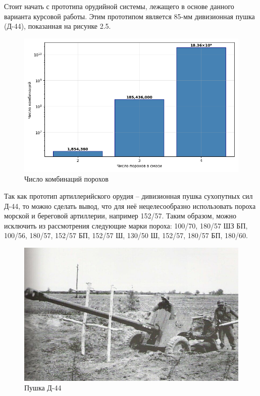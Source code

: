 \documentclass[14pt, a4paper]{extreport} %
\begin{document}
Стоит начать с прототипа орудийной системы, лежащего в основе данного варианта курсовой работы. Этим прототипом является 85-мм дивизионная пушка (Д-44), показанная на рисунке 2.5.

\begin{figure}[H]
\centering
\includegraphics[width=0.5\textheight]{imgs/GISTO.png}
\caption{Число комбинаций порохов}
\end{figure}

Так как прототип артиллерийского орудия -- дивизионная пушка сухопутных сил Д-44, то можно сделать вывод, что для неё нецелесообразно использовать пороха морской и береговой артиллерии, например 152/57. 
Таким образом, можно исключить из рассмотрения следующие марки пороха: 100/70, 180/57 ШЗ БП, 100/56, 180/57, 152/57 БП, 152/57 Ш, 130/50 Ш, 152/57, 180/57 БП, 180/60.

\begin{figure}[H]
\centering
\includegraphics[width=0.35\textheight]{imgs/D44.jpg}
\caption{Пушка Д-44}
\end{figure}
\end{document}
